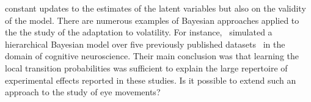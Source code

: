 \documentclass[12pt,english]{article}%
\newcommand{\citep}[1]{\parencite{#1}}
\newcommand{\citet}[1]{\textcite{#1}}
\begin{document}
constant updates to the estimates of the latent variables 
but also on the validity of the model.
%
There are numerous examples of Bayesian approaches
applied to the the study of the adaptation to volatility.
For instance,~\citet{Meyniel16} simulated a hierarchical Bayesian model
over five previously published datasets~\citep{Squires1976, Huettel2002, Kolossa2013, Cho2002, Falk1997} in the domain of cognitive neuroscience.
Their main conclusion was that
learning the local transition probabilities
was sufficient to explain the large repertoire
of experimental effects reported in these studies.
%
Is it possible to extend such an approach to the study of eye movements?
\end{document}
